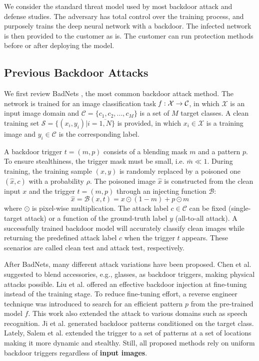 \documentclass{article}
\begin{document}
We consider the standard threat model used by most backdoor attack and defense studies. The adversary has total control over the training process, and purposely trains the deep neural network with a backdoor. The infected network is then provided to the customer as is. The customer can run protection methods before or after deploying the model.

\subsection{Previous Backdoor Attacks}
We first review BadNets \cite{gu2017badnets}, the most common backdoor attack method. The network is trained for an image classification task $\it{f}:\mathcal{X} \rightarrow \mathcal{C}$, in which $\mathcal{X}$ is an input image domain and $\mathcal{C} = \{c_1, c_2, ..., c_M\}$ is a set of $M$ target classes. A clean training set $\mathcal{S} = \{(x_i, y_i) | i=\overline{1,N}\}$ is provided, in which $x_i \in \mathcal{X}$ is a training image and $y_i \in \mathcal{C}$ is the corresponding label.

A backdoor trigger $t = (m, p)$ consists of a blending mask $m$ and a pattern $p$. To ensure stealthiness, the trigger mask must be small, i.e. $\bar{m} \ll 1$. During training, the training sample $(x,y)$ is randomly replaced by a poisoned one $(\hat{x},c)$ with a probability $\rho$. The poisoned image $\hat{x}$ is constructed from the clean input $x$ and the trigger $t = (m, p)$ through an injecting function $\mathcal{B}$:
\begin{equation}
\hat{x} = \mathcal{B}(x,t) = x \odot (1-m) + p \odot m 
\label{eq:backdoor}
\end{equation}
where $\odot$ is pixel-wise multiplication. The attack label $c \in \mathcal{C}$ can be fixed (single-target attack) or a function of the ground-truth label $y$ (all-to-all attack). 
A successfully trained backdoor model will accurately classify clean images while returning the predefined attack label $c$ when the trigger $t$ appears. These scenarios are called clean test and attack test, respectively.

After BadNets, many different attack variations have been proposed. Chen et al. \cite{chen2017targeted} suggested to blend accessories, e.g., glasses, as backdoor triggers, making physical attacks possible. Liu et al. \cite{liu2017trojaning} offered an effective backdoor injection at fine-tuning instead of the training stage. To reduce fine-tuning effort, a reverse engineer technique was introduced to search for an efficient pattern $p$ from the pre-trained model $f$. This work also extended the attack to various domains such as speech recognition. Ji et al. \cite{ji2019programmable} generated backdoor patterns conditioned on the target class. Lately, Salem et al. \cite{salem2020dynamic} extended the trigger to a set of patterns at a set of locations making it more dynamic and stealthy. Still, all proposed methods rely on uniform backdoor triggers regardless of \textbf{input images}.
\end{document}

